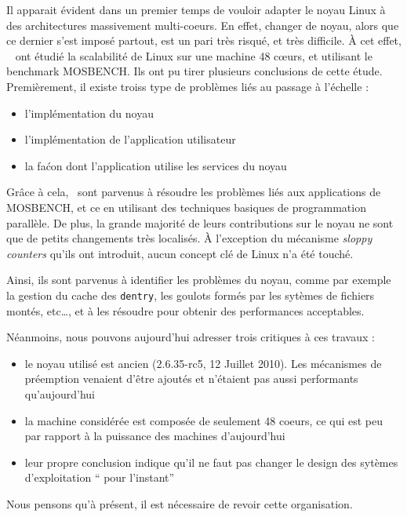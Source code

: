       Il apparait évident dans un premier temps de vouloir adapter le noyau
      Linux à des architectures massivement multi-coeurs. En effet, changer de
      noyau, alors que ce dernier s’est imposé partout, est un pari très risqué,
      et très difficile. À cet effet, ~\citet{boyd2010analysis} ont étudié la
      scalabilité de Linux sur une machine 48 c\oe urs, et utilisant le
      benchmark MOSBENCH. Ils ont pu tirer plusieurs conclusions de cette étude.
      Premièrement, il existe troiss type de problèmes liés au passage à
      l’échelle :
      \begin{itemize}
        \item l’implémentation du noyau
        \item l’implémentation de l’application utilisateur
        \item la faćon dont l’application utilise les services du noyau
      \end{itemize}
      Grâce à cela,~\citeauthor{boyd2010analysis} sont parvenus à résoudre les
      problèmes liés aux applications de MOSBENCH, et ce en utilisant des
      techniques basiques de programmation parallèle. De plus, la grande
      majorité de leurs contributions sur le noyau ne sont que de petits
      changements très localisés. À l’exception du mécanisme \textit{sloppy
        counters} qu'ils ont introduit, aucun concept clé de Linux n'a été
      touché. 

      Ainsi, ils sont parvenus à identifier les problèmes du noyau, comme par
      exemple la gestion du cache des \texttt{dentry}, les goulots formés par
      les sytèmes de fichiers montés, etc\ldots, et à les résoudre pour obtenir
      des performances acceptables.

      Néanmoins, nous pouvons aujourd’hui adresser trois critiques à ces travaux
      :
      \begin{itemize}
        \item le noyau utilisé est ancien (2.6.35-rc5, 12 Juillet 2010). Les
          mécanismes de préemption venaient d’être ajoutés et n’étaient pas
          aussi performants qu'aujourd'hui
        \item la machine considérée est composée de seulement 48 coeurs, ce qui
          est peu par rapport à la puissance des machines d’aujourd’hui
        \item leur propre conclusion indique qu’il ne faut pas changer le design
          des sytèmes d’exploitation `` pour l’instant''
      \end{itemize}
      Nous pensons qu’à présent, il est nécessaire de revoir cette organisation.

